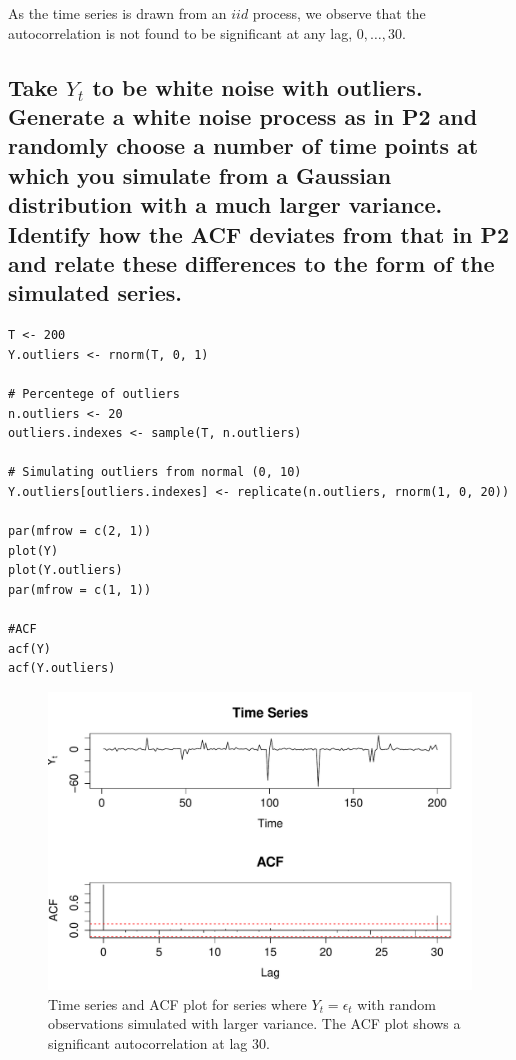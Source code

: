 \documentclass[10pt,a4paper]{article}
\let\Oldsubsection\subsection
\renewcommand{\subsection}{\FloatBarrier\Oldsubsection}
\begin{document}
As the time series is drawn from an $iid$ process, we observe that the autocorrelation is not found to be significant at any lag, $0, \dots, 30$.

\subsection{Take $Y_t$ to be white noise with outliers. Generate a white noise process as in P2 and randomly choose a number of time points at which you simulate from a Gaussian
distribution with a much larger variance. Identify how the ACF deviates from that
in P2 and relate these differences to the form of the simulated series.}

\begin{lstlisting}
T <- 200
Y.outliers <- rnorm(T, 0, 1)

# Percentege of outliers
n.outliers <- 20
outliers.indexes <- sample(T, n.outliers)

# Simulating outliers from normal (0, 10)
Y.outliers[outliers.indexes] <- replicate(n.outliers, rnorm(1, 0, 20))

par(mfrow = c(2, 1))  
plot(Y)
plot(Y.outliers)
par(mfrow = c(1, 1))

#ACF
acf(Y)
acf(Y.outliers)
\end{lstlisting}
\begin{figure}[ht]
\includegraphics[width=\linewidth]{plots/p3.pdf}
\caption{Time series and ACF plot for series where $Y_t = \epsilon_t$ with random observations simulated with larger variance. The ACF plot shows a significant autocorrelation at lag 30.}
\end{figure}
\end{document}
